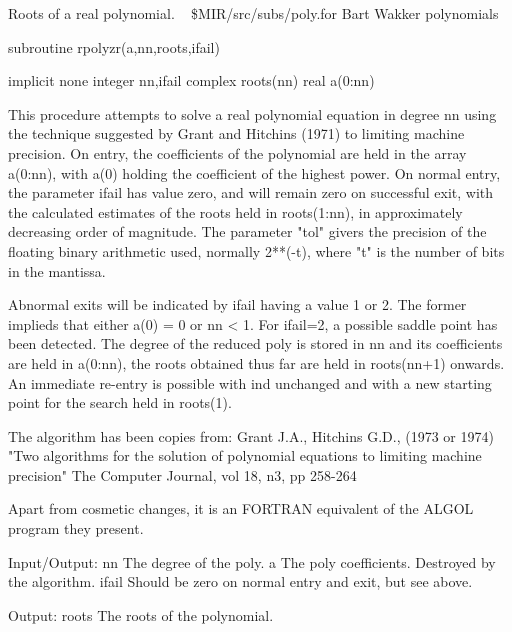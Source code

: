 %
\noindent Roots of a real polynomial.
\newline \ 
\newline {} \$MIR/src/subs/poly.for
\newline {} Bart Wakker
\newline {} polynomials
\par{\tenpoint
{\eightpoint\begintt
      subroutine rpolyzr(a,nn,roots,ifail)

      implicit none
      integer nn,ifail
      complex roots(nn)
      real a(0:nn)

  This procedure attempts to solve a real polynomial equation in degree nn
  using the technique suggested by Grant and Hitchins (1971) to limiting
  machine precision. On entry, the coefficients of the polynomial are
  held in the array a(0:nn), with a(0) holding the coefficient of the
  highest power. On normal entry, the parameter ifail has value zero,
  and will remain zero on successful exit, with the calculated estimates
  of the roots held in roots(1:nn), in approximately decreasing order
  of magnitude. The parameter "tol" givers the precision of the floating
  binary arithmetic used, normally 2**(-t), where "t" is the number
  of bits in the mantissa.

  Abnormal exits will be indicated by ifail having a value 1 or 2. The
  former implieds that either a(0) = 0 or nn < 1. For ifail=2, a
  possible saddle point has been detected. The degree of the reduced poly
  is stored in nn and its coefficients are held in a(0:nn), the roots
  obtained thus far are held in roots(nn+1) onwards. An immediate
  re-entry is possible with ind unchanged and with a new starting
  point for the search held in roots(1).

  The algorithm has been copies from:
    Grant J.A., Hitchins G.D., (1973 or 1974) "Two algorithms for the
    solution of polynomial equations to limiting machine precision"
    The Computer Journal, vol 18, n3, pp 258-264

  Apart from cosmetic changes, it is an FORTRAN equivalent of the
  ALGOL program they present.

  Input/Output:
    nn         The degree of the poly. 
    a          The poly coefficients.  Destroyed by the algorithm.
    ifail      Should be zero on normal entry and exit, but see above.

  Output:
    roots      The roots of the polynomial.
\endtt}
\par}
%
